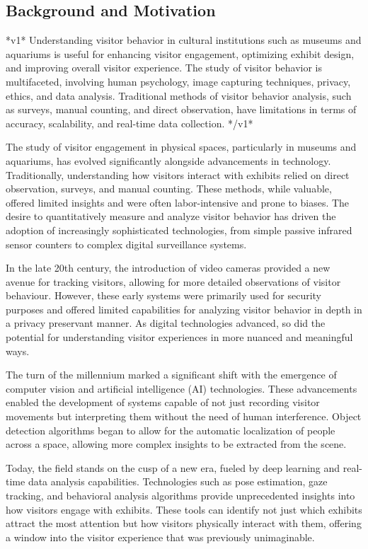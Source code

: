\subsection{Background and Motivation}

*v1*
Understanding visitor behavior in cultural institutions such as museums and aquariums is useful for enhancing visitor engagement, optimizing exhibit design, and improving overall visitor experience. The study of visitor behavior is multifaceted, involving human psychology, image capturing techniques, privacy, ethics, and data analysis. Traditional methods of visitor behavior analysis, such as surveys, manual counting, and direct observation, have limitations in terms of accuracy, scalability, and real-time data collection.
*/v1*





The study of visitor engagement in physical spaces, particularly in museums and aquariums, has evolved significantly alongside advancements in technology. Traditionally, understanding how visitors interact with exhibits relied on direct observation, surveys, and manual counting. These methods, while valuable, offered limited insights and were often labor-intensive and prone to biases. The desire to quantitatively measure and analyze visitor behavior has driven the adoption of increasingly sophisticated technologies, from simple passive infrared sensor counters to complex digital surveillance systems.

In the late 20th century, the introduction of video cameras provided a new avenue for tracking visitors, allowing for more detailed observations of visitor behaviour. However, these early systems were primarily used for security purposes and offered limited capabilities for analyzing visitor behavior in depth in a privacy preservant manner. As digital technologies advanced, so did the potential for understanding visitor experiences in more nuanced and meaningful ways.

The turn of the millennium marked a significant shift with the emergence of computer vision and artificial intelligence (AI) technologies. These advancements enabled the development of systems capable of not just recording visitor movements but interpreting them without the need of human interference. Object detection algorithms began to allow for the automatic localization of people across a space, allowing more complex insights to be extracted from the scene.

Today, the field stands on the cusp of a new era, fueled by deep learning and real-time data analysis capabilities. Technologies such as pose estimation, gaze tracking, and behavioral analysis algorithms provide unprecedented insights into how visitors engage with exhibits. These tools can identify not just which exhibits attract the most attention but how visitors physically interact with them, offering a window into the visitor experience that was previously unimaginable.

